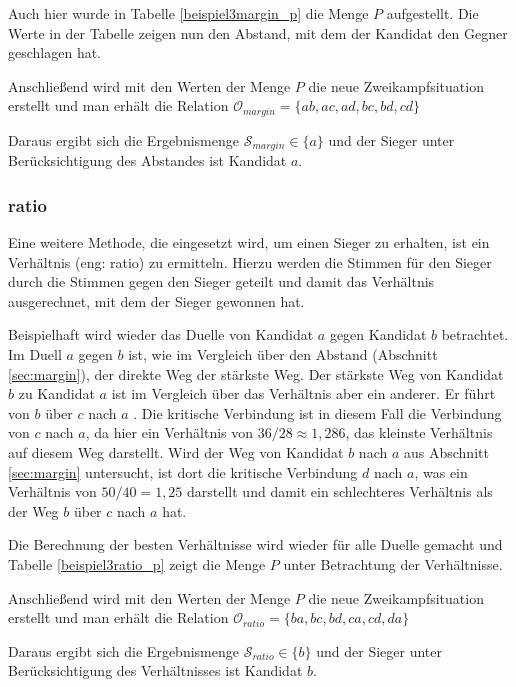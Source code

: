 Auch hier wurde in Tabelle \ref{beispiel3margin_p} die Menge $P$ aufgestellt. Die Werte in der Tabelle zeigen nun den Abstand, mit dem der Kandidat den Gegner geschlagen hat.



Anschließend wird mit den Werten der Menge $P$ die neue Zweikampfsituation erstellt und man erhält die Relation $\mathcal{O}_{margin} = \{ ab, ac,ad,bc,bd,cd \}$

Daraus ergibt sich die Ergebnismenge $\mathcal{S}_{margin} \in \{ a\}$ und der Sieger unter Berücksichtigung des Abstandes ist Kandidat $a$.

\subsubsection{ratio}
\label{sec:ratio}
Eine weitere Methode, die eingesetzt wird, um einen Sieger zu erhalten, ist ein Verhältnis (eng: ratio) zu ermitteln. Hierzu werden die Stimmen für den Sieger durch die Stimmen gegen den Sieger geteilt und damit das Verhältnis ausgerechnet, mit dem der Sieger gewonnen hat.

Beispielhaft wird wieder das Duelle von Kandidat $a$ gegen Kandidat $b$ betrachtet. Im Duell $a$ gegen $b$ ist, wie im Vergleich über den Abstand (Abschnitt \ref{sec:margin}), der direkte Weg der stärkste Weg. Der stärkste Weg von Kandidat $b$ zu Kandidat $a$ ist im Vergleich über das Verhältnis aber ein anderer. Er führt von $b$ über $c$ nach $a$ . Die kritische Verbindung ist in diesem Fall die Verbindung von $c$ nach $a$, da hier ein Verhältnis von $36/28 \approx 1,286$, das kleinste Verhältnis auf diesem Weg darstellt. Wird der Weg von Kandidat $b$ nach $a$ aus Abschnitt \ref{sec:margin} untersucht, ist dort die kritische Verbindung $d$ nach $a$, was ein Verhältnis von $ 50/40 = 1,25$ darstellt und damit ein schlechteres Verhältnis als der Weg $b$ über $c$ nach $a$ hat.

Die Berechnung der besten Verhältnisse wird wieder für alle Duelle gemacht und  Tabelle \ref{beispiel3ratio_p} zeigt die Menge $P$ unter Betrachtung der Verhältnisse.



Anschließend wird mit den Werten der Menge $P$ die neue Zweikampfsituation erstellt und man erhält die Relation $\mathcal{O}_{ratio} = \{ ba,bc,bd,ca,cd,da \}$

Daraus ergibt sich die Ergebnismenge $\mathcal{S}_{ratio} \in \{ b\}$ und der Sieger unter Berücksichtigung des Verhältnisses ist Kandidat $b$.

